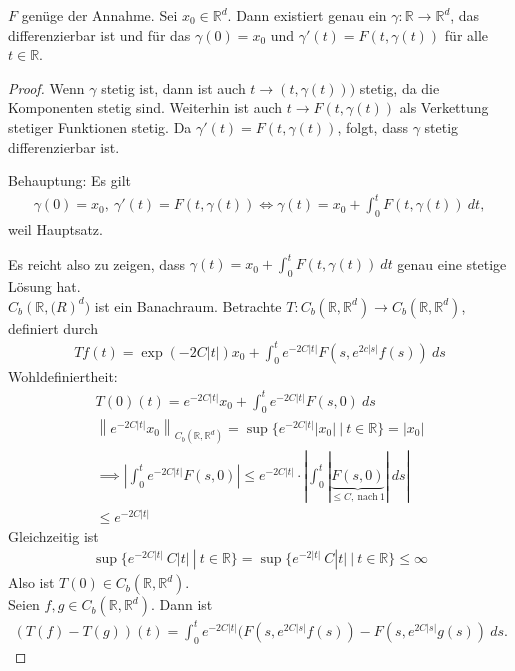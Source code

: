 \documentclass[11pt,twoside]{memoir}
\newcommand{\norm}[1]{\left\lVert#1\right\rVert}
\begin{document}
\begin{thm}
	$F$ genüge der Annahme. Sei $x_0\in \mathbb{R}^d$. Dann existiert genau ein $\gamma: \mathbb{R}\to \mathbb{R}^d$, das differenzierbar ist und für das $\gamma(0) = x_0$ und $\gamma'(t) = F(t,\gamma(t))$ für alle $t\in \mathbb{R}$.
\end{thm}
\begin{proof}
	Wenn $\gamma$ stetig ist, dann ist auch $t\to (t,\gamma(t)))$ stetig, da die Komponenten stetig sind. Weiterhin ist auch $t \to F(t,\gamma(t))$ als Verkettung stetiger Funktionen stetig. Da $\gamma' (t) = F(t,\gamma(t))$, folgt, dass $\gamma$ stetig differenzierbar ist.\par
	Behauptung: Es gilt
	\begin{align*}
		\gamma(0) = x_0,~\gamma'(t) = F(t,\gamma(t)) \Longleftrightarrow \gamma(t) = x_0 +\int_0^t F(t,\gamma(t))~dt,
	\end{align*}
	weil Hauptsatz.\par
	Es reicht also zu zeigen, dass $\gamma(t) = x_0 + \int_0^t F(t,\gamma(t))~dt$ genau eine stetige Lösung hat.\\
	$C_b(\mathbb{R},\mathbb(R)^d)$ ist ein Banachraum. Betrachte $T: C_b(\mathbb{R},\mathbb{R}^d) \to C_b(\mathbb{R},\mathbb{R}^d)$, definiert durch
	\begin{align*}
		Tf(t) = \exp(-2C|t|)x_0 + \int_{0}^t e^{-2C|t|}F(s,e^{2c|s|}f(s))~ds
	\end{align*}
	Wohldefiniertheit:
	\begin{align*}
		T(0)(t) = e^{-2C|t|}x_0 + \int_{0}^t e^{-2C|t|} F(s,0)~ds\\
		\norm{e^{-2C|t|}x_0}_{C_b(\mathbb{R},\mathbb{R}^d)} = \sup \big \{  e^{-2C|t|} |x_0|~|~t\in \mathbb{R} \big \} = |x_0|\\
		\implies \left| \int_{0}^te^{-2C|t|}F(s,0)\right| \leq e^{-2C|t|}\cdot \left| \int_0^t|\underbrace{F(s,0)}_{\leq C,~\mathrm{nach}~1}|~ds \right|\\
		\leq e^{-2C|t|}
	\end{align*}
	Gleichzeitig ist
	\begin{align*}
		\sup\big\{ e^{-2C|t|}~C|t| ~|~t\in \mathbb{R}\big \} = \sup\big\{ e^{-2|t|}~C|t| ~|~t\in \mathbb{R}\big \} \leq \infty
	\end{align*}
	Also ist $T(0) \in C_b(\mathbb{R},\mathbb{R}^d)$.\\
	Seien $f,g\in C_b(\mathbb{R},\mathbb{R}^d)$. Dann ist
	\begin{align*}
		(T(f)-T(g))(t) = \int_{0}^t e^{-2C|t|}(F(s,e^{2C|s|}f(s)) - F(s,e^{2C|s|} g(s))~ds.

\end{align*}
\end{proof}
\end{document}
